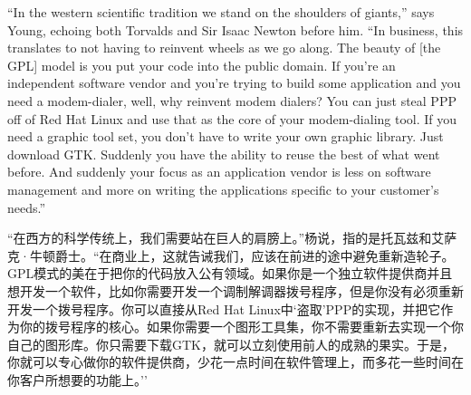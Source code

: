 \ifdefined\eng
``In the western scientific tradition we stand on the shoulders of giants,'' says Young, echoing both Torvalds and Sir Isaac Newton before him. ``In business, this translates to not having to reinvent wheels as we go along. The beauty of [the GPL] model is you put your code into the public domain. If you're an independent software vendor and you're trying to build some application and you need a modem-dialer, well, why reinvent modem dialers? You can just steal PPP off of Red Hat Linux and use that as the core of your modem-dialing tool. If you need a graphic tool set, you don't have to write your own graphic library. Just download GTK. Suddenly you have the ability to reuse the best of what went before. And suddenly your focus as an application vendor is less on software management and more on writing the applications specific to your customer's needs.''
\fi

\ifdefined\chs
``在西方的科学传统上，我们需要站在巨人的肩膀上。''杨说，指的是托瓦兹和艾萨克·牛顿爵士。``在商业上，这就告诫我们，应该在前进的途中避免重新造轮子。GPL模式的美在于把你的代码放入公有领域。如果你是一个独立软件提供商并且想开发一个软件，比如你需要开发一个调制解调器拨号程序，但是你没有必须重新开发一个拨号程序。你可以直接从Red Hat Linux中`盗取'PPP的实现，并把它作为你的拨号程序的核心。如果你需要一个图形工具集，你不需要重新去实现一个你自己的图形库。你只需要下载GTK，就可以立刻使用前人的成熟的果实。于是，你就可以专心做你的软件提供商，少花一点时间在软件管理上，而多花一些时间在你客户所想要的功能上。''
\fi


